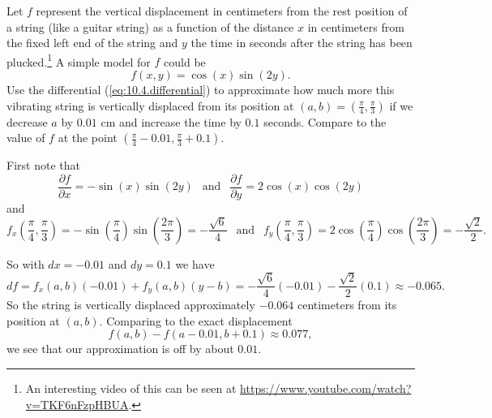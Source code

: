 \begin{activity} \label{A:10.4.4} Let $f$ represent the vertical displacement in centimeters from the rest position of a string (like a guitar string) as a function of the distance $x$ in centimeters from the fixed left end of the string and $y$ the time in seconds after the string has been plucked.\footnote{An interesting video of this can be seen at \url{https://www.youtube.com/watch?v=TKF6nFzpHBUA}.} A simple model for $f$ could be
\[f(x,y) = \cos(x)\sin(2y).\]
Use the differential (\ref{eq:10.4.differential}) to approximate how much more this vibrating string is vertically displaced from its position at $(a,b) = \left(\frac{\pi}{4}, \frac{\pi}{3} \right)$ if we decrease $a$ by $0.01$ cm and increase the time by $0.1$ seconds. Compare to the value of $f$ at the point $\left(\frac{\pi}{4}-0.01, \frac{\pi}{3}+0.1\right)$.




\end{activity}
\begin{smallhint}

\end{smallhint}
\begin{bighint}

\end{bighint}
\begin{activitySolution}
First note that
\[\frac{\partial f}{\partial x} = -\sin(x)\sin(2y) \ \ \text{ and } \ \ \frac{\partial f}{\partial y} = 2\cos(x)\cos(2y)\]
and
\[f_x\left(\frac{\pi}{4}, \frac{\pi}{3}\right) = -\sin\left(\frac{\pi}{4}\right)\sin\left(\frac{2\pi}{3}\right) = -\frac{\sqrt{6}}{4} \ \ \text{ and } \ \ f_y\left(\frac{\pi}{4}, \frac{\pi}{3}\right) = 2\cos\left(\frac{\pi}{4}\right)\cos\left(\frac{2\pi}{3}\right) = -\frac{\sqrt{2}}{2}.\]

So with $dx = -0.01$ and $dy = 0.1$ we have 
\[df = f_x(a,b)(-0.01) + f_y(a,b)(y-b) = -\frac{\sqrt{6}}{4}(-0.01) - \frac{\sqrt{2}}{2}(0.1) \approx -0.065.\]
So the string is vertically displaced approximately $-0.064$ centimeters from its position at $(a,b)$. Comparing to the exact displacement
\[f(a,b) - f(a-0.01, b+0.1) \approx 0.077,\]
we see that our approximation is off by about $0.01$.
\end{activitySolution}
\aftera
